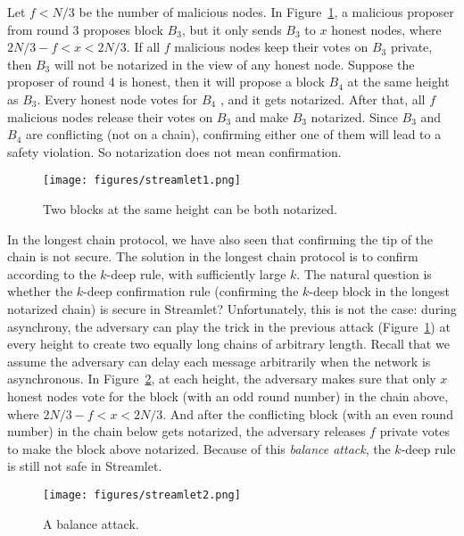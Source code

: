 \documentclass{article}
\begin{document}
 Let $f < N/3$ be the number of malicious nodes. In Figure~\ref{fig:streamlet1}, a malicious proposer from round 3 proposes block $B_3$, but it only sends $B_3$ to $x$ honest nodes, where $2N/3 -f<x<2N/3$. If all $f$ malicious nodes keep their votes on $B_3$ private, then $B_3$ will not be notarized in the view of any honest node. Suppose the proposer of round 4 is honest, then it will propose a block $B_4$ at the same height as $B_3$. Every honest node votes for $B_4$ , and it gets notarized. After that, all $f$ malicious nodes release their votes on $B_3$ and make $B_3$ notarized. Since $B_3$ and $B_4$ are conflicting (not on a chain), confirming either one of them will lead to a safety violation. So notarization does not mean confirmation.

\begin{figure}
    \centering
    \texttt{[image: figures/streamlet1.png]}
    \caption{Two blocks at the same height can be both notarized.}
    \label{fig:streamlet1}
\end{figure}

 In the longest chain protocol, we have also seen that confirming the tip of the chain is not secure. The solution in the longest chain protocol is to confirm according to the $k$-deep rule, with sufficiently large $k$. The natural question is  whether  the $k$-deep confirmation rule (confirming the $k$-deep block in the longest notarized chain) is secure in Streamlet? Unfortunately, this is not the case:  during asynchrony, the adversary can play the trick in the previous attack (Figure~\ref{fig:streamlet1}) at every height to create two equally long chains of arbitrary length. Recall that we assume the adversary can delay each message arbitrarily when the network is asynchronous. In Figure~\ref{fig:streamlet2}, at each height, the adversary makes sure that only $x$ honest nodes vote for the block (with an odd round number) in the chain above, where $2N/3 -f<x<2N/3$. And after the conflicting block (with an even round number) in the chain below gets notarized, the adversary releases $f$ private votes to make the block above notarized. Because of this {\em balance attack}, the $k$-deep rule is still not safe in Streamlet. 

\begin{figure}
    \centering
    \texttt{[image: figures/streamlet2.png]}
    \caption{A balance attack.}
    \label{fig:streamlet2}
\end{figure}
\end{document}

